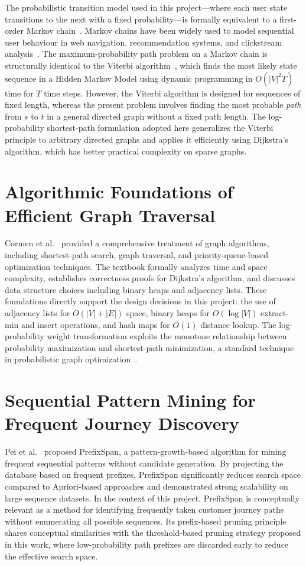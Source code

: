 The probabilistic transition model used in this project---where each user state transitions to the next with a fixed probability---is formally equivalent to a first-order Markov chain~\citep{norris1998markov}. Markov chains have been widely used to model sequential user behaviour in web navigation, recommendation systems, and clickstream analysis~\citep{rabiner1989hmm,baum1966statistical}. The maximum-probability path problem on a Markov chain is structurally identical to the Viterbi algorithm~\citep{viterbi1967error}, which finds the most likely state sequence in a Hidden Markov Model using dynamic programming in $O(|V|^2 T)$ time for $T$ time steps. However, the Viterbi algorithm is designed for sequences of fixed length, whereas the present problem involves finding the most probable \emph{path} from $s$ to $t$ in a general directed graph without a fixed path length. The log-probability shortest-path formulation adopted here generalizes the Viterbi principle to arbitrary directed graphs and applies it efficiently using Dijkstra's algorithm, which has better practical complexity on sparse graphs.

\section{Algorithmic Foundations of Efficient Graph Traversal}

Cormen et al.~\citep{cormen2009} provided a comprehensive treatment of graph algorithms, including shortest-path search, graph traversal, and priority-queue-based optimization techniques. The textbook formally analyzes time and space complexity, establishes correctness proofs for Dijkstra's algorithm, and discusses data structure choices including binary heaps and adjacency lists. These foundations directly support the design decisions in this project: the use of adjacency lists for $O(|V|+|E|)$ space, binary heaps for $O(\log|V|)$ extract-min and insert operations, and hash maps for $O(1)$ distance lookup. The log-probability weight transformation exploits the monotone relationship between probability maximization and shortest-path minimization, a standard technique in probabilistic graph optimization~\citep{manning2008nlp}.

\section{Sequential Pattern Mining for Frequent Journey Discovery}

Pei et al.~\citep{pei2001prefixspan} proposed PrefixSpan, a pattern-growth-based algorithm for mining frequent sequential patterns without candidate generation. By projecting the database based on frequent prefixes, PrefixSpan significantly reduces search space compared to Apriori-based approaches and demonstrated strong scalability on large sequence datasets. In the context of this project, PrefixSpan is conceptually relevant as a method for identifying frequently taken customer journey paths without enumerating all possible sequences. Its prefix-based pruning principle shares conceptual similarities with the threshold-based pruning strategy proposed in this work, where low-probability path prefixes are discarded early to reduce the effective search space.

